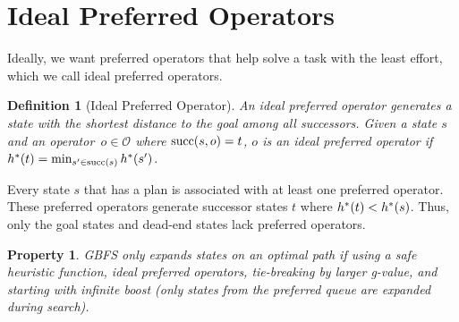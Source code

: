 \documentclass[ppgc,diss,english]{iiufrgs}
\newtheorem{definition}{Definition}
\newtheorem{property}{Property}
\begin{document}
\section{Ideal Preferred Operators}
\label{sec:sample-ideal-po}
Ideally, we want preferred operators that help solve a task with the least effort, which we call ideal preferred operators.

\begin{definition}[Ideal Preferred Operator]\label{def:ideal_preferred_operator}
  An ideal preferred operator generates a state with the shortest distance to the goal among all successors. Given a state $s$ and an operator~$o \in \mathcal{O}$ where $\operatorname{succ}(s,o) = t$, $o$ is an ideal preferred operator if $h^*({t}) = \min_{s' \in \operatorname{succ}(s)} h^*({s'})$.
\end{definition}

Every state $s$ that has a plan is associated with at least one preferred operator. These preferred operators generate successor states $t$ where $h^*({t}) < h^*({s})$. Thus, only the goal states and dead-end states lack preferred operators.

\begin{property}
  \label{prop:ideal-optimal}
  GBFS only expands states on an optimal path if using a safe heuristic function, ideal preferred operators, tie-breaking by larger g-value, and starting with infinite boost (only states from the preferred queue are expanded during search).
\end{property}
\end{document}
